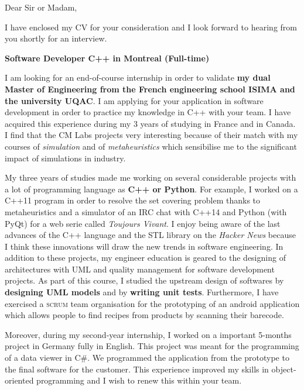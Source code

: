 \date{\today}
\opening{Dear Sir or Madam,}
\closing{I have enclosed my CV for your consideration and I look forward to hearing from you shortly for an interview.}

\makelettertitle

\textbf{Software Developer C++ in Montreal (Full-time)}

I am looking for an end-of-course internship in order to validate \textbf{my dual Master of Engineering from the French engineering school ISIMA and the university UQAC}. I am applying for your application in software development in order to practice my knowledge in C++ with your team. I have acquired this experience during my 3 years of studying in France and in Canada. I find that the CM Labs projects very interesting because of their match with my courses of \textit{simulation} and of \textit{metaheuristics} which sensibilise me to the significant impact of simulations in industry.

My three years of studies made me working on several considerable projects with a lot of programming language as \textbf{C++ or Python}. For example, I worked on a C++11 program in order to resolve the set covering problem thanks to metaheuristics and a simulator of an IRC chat with C++14 and Python (with PyQt) for a web serie called \textit{Toujours Vivant}. I enjoy being aware of the last advances of the C++ language and the STL library on the \textit{Hacker News} because I think these innovations will draw the new trends in software engineering. In addition to these projects, my engineer education is geared to the designing of architectures with UML and quality management for software development projects. As part of this course, I studied the upstream design of softwares by \textbf{designing UML models} and by \textbf{writing unit tests}. Furthermore, I have exercised a \textsc{scrum} team organisation for the prototyping of an android application which allows people to find recipes from products by scanning their barecode.

Moreover, during my second-year internship, I worked on a important 5-months project in Germany fully in English. This project was meant for the programming of a data viewer in C\#. We programmed the application from the prototype to the final software for the customer. This experience improved my skills in object-oriented programming and I wish to renew this within your team.

\makeletterclosing
